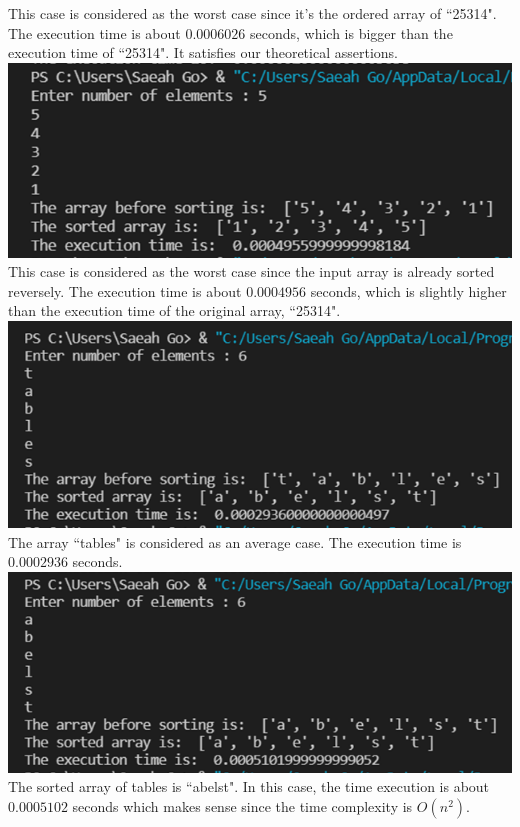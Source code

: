 \documentclass{article}
\begin{document}
This case is considered as the worst case since it's the ordered array of ``25314". The execution time is about $0.0006026$ seconds, which is bigger than the execution time of ``25314". It satisfies our theoretical assertions.\\
\includegraphics[scale = 0.7]{Reversed 25314} \\
This case is considered as the worst case since the input array is already sorted reversely. The execution time is about $0.0004956$ seconds, which is slightly higher than the execution time of the original array, ``25314".\\
\includegraphics[scale = 0.7]{tables} \\
The array ``tables" is considered as an average case. The execution time is $0.0002936$ seconds. \\
\includegraphics[scale = 0.7]{Ordered tables} \\
The sorted array of tables is ``abelst". In this case, the time execution is about $0.0005102$ seconds which makes sense since the time complexity is $O(n^2)$. \\
\end{document}

